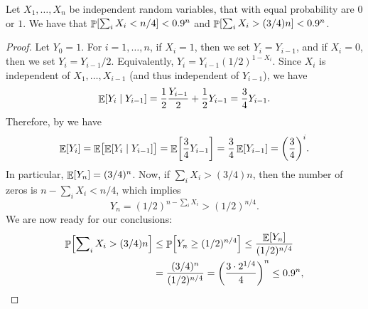 \begin{lemma}
    Let $X_1, \ldots, X_n$ be independent random variables, that with
    equal probability are $0$ or $1$.  We have that
    $\Prob{ \sum_i X_i < n/4} < 0.9^n$ and
    $\Prob{ \sum_i X_i > (3/4) n} < 0.9^n$.
\end{lemma} 
\begin{proof}
    Let $Y_0 = 1$. For $i = 1, \ldots, n$, if $X_i = 1$, then we set
    $Y_i = Y_{i-1}$, and if $X_i = 0$, then we set $Y_i = Y_{i-1}/2$.
    Equivalently, $Y_i = Y_{i-1} (1/2)^{1 - X_i}$.
    Since $X_i$ is independent of $X_1, \ldots, X_{i-1}$ (and thus
    independent of $Y_{i-1}$), we have
    \begin{equation*}
        \ExCond{Y_i}{Y_{i-1}}%
        =%
        \frac{1}{2} \frac{Y_{i-1}}{2} +
        \frac{1}{2} Y_{i-1}
        = \frac{3}{4} Y_{i-1}.
    \end{equation*}
    Therefore, by  we have
    \begin{equation*}
        \Ex{Y_i}%
        =%
        \Ex{ \bigl. \ExCond{Y_i}{Y_{i-1}}}
        =%
        \Ex{ \frac{3}{4} Y_{i-1}}%
        =%
        \frac{3}{4}\Ex{  Y_{i-1}}%
        =%
        \pth{\frac{3}{4}}^i.
    \end{equation*}
    In particular, $\mathop{\mathbb{E}}\!\left[ {Y_n} \right] = (3/4)^n$.
    Now, if $\sum_i X_i > (3/4) n$, then the number of zeros is
    $n - \sum_i X_i < n/4$, which implies 
    \begin{equation*}
        Y_n = (1/2)^{n - \sum_i X_i} > (1/2)^{n/4}.
    \end{equation*}
    We are now ready for our conclusions:
    \begin{align*}
        \Prob{ \sum\nolimits_i X_i > (3/4) n }
        &\leq%
        \Prob{ Y_n \geq (1/2)^{n/4}}
        \leq%
        \frac{\Ex{Y_n}}{(1/2)^{n/4}} \\
        &=%
        \frac{(3/4)^n}{(1/2)^{n/4}}
        =%
        \pth{\frac{3 \cdot 2^{1/4}}{4}}^n
        \leq
        0.9^n,
    \end{align*}

\end{proof}
